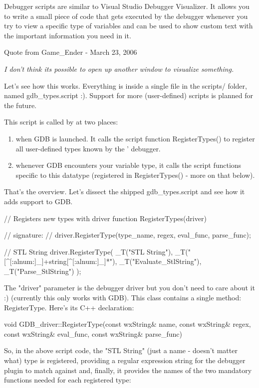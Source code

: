 Debugger scripts are similar to Visual Studio Debugger Visualizer. It allows you to write a small piece of code that gets executed by the debugger whenever you try to view a specific type of variables and can be used to show custom text with the important information you need in it.

Quote from Game\_Ender - March 23, 2006

\textit{I don't think its possible to open up another window to visualize something.}

Let's see how this works. Everything is inside a single file in the scripts/ folder, named gdb\_types.script :). Support for more (user-defined) scripts is planned for the future.


This script is called by \codeblocks at two places:
\begin{enumerate}
\item when GDB is launched. It calls the script function RegisterTypes() to register all user-defined types known by the \codeblocks' debugger.
\item whenever GDB encounters your variable type, it calls the script functions specific to this datatype (registered in RegisterTypes() - more on that below).
\end{enumerate}

That's the overview. Let's dissect the shipped gdb\_types.script and see how it adds  support to GDB.

\begin{code}
// Registers new types with driver
function RegisterTypes(driver)
{
//    signature:
//    driver.RegisterType(type_name, regex, eval_func, parse_func); 

    // STL String
    driver.RegisterType(
        _T("STL String"),
        _T("[^[:alnum:]_]+string[^[:alnum:]_]*"),
        _T("Evaluate_StlString"),
        _T("Parse_StlString")
    );
}
\end{code}

The "driver" parameter is the debugger driver but you don't need to care about it :) (currently this only works with GDB). This class contains a single method: RegisterType. Here's its C++ declaration:

\begin{code}
void GDB_driver::RegisterType(const wxString& name, const wxString& regex, 
                      const wxString& eval_func, const wxString& parse_func)
\end{code}

So, in the above script code, the "STL String" (just a name - doesn't matter what) type is registered, providing a regular expression string for the debugger plugin to match against and, finally, it provides the names of the two mandatory functions needed for each registered type:

